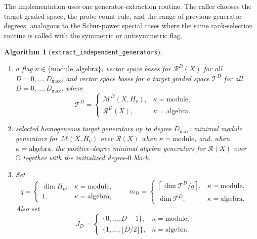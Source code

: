 \documentclass[11pt]{article}
\newcommand{\dsC}{\mathbb{C}}
\newcommand{\scM}{\mathcal{M}}
\newcommand{\scR}{\mathcal{R}}
\newcommand{\scT}{\mathcal{T}}
\newtheorem{algorithm}[theorem]{Algorithm}
\theoremstyle{definition}
\begin{document}
The implementation uses one generator-extraction routine. The caller chooses the target graded space, the probe-count rule, and the range of previous generator degrees, analogous to the Schur-power special cases where the same rank-selection routine is called with the symmetric or antisymmetric flag.

\begin{algorithm}[\texttt{extract\_independent\_generators}]\label{alg:extract-independent-generators}

  \phantom{}
  \begin{enumerate}[label=\textbf{Step \arabic*.},leftmargin=2.8cm]

    \item[\textbf{Input:}] a flag $\kappa\in\{\mathrm{module},\mathrm{algebra}\}$; vector space bases for $\scR^D(X)$ for all $D=0,\dots,D_{\max}$; and vector space bases for a target graded space $\scT^D$ for all $D=0,\dots,D_{\max}$, where
    \[
      \scT^D=
      \begin{cases}
        \scM^D(X,H_\nu), & \kappa=\mathrm{module},\\
        \scR^D(X), & \kappa=\mathrm{algebra}.
      \end{cases}
    \]

    \item[\textbf{Output:}] selected homogeneous target generators up to degree $D_{\max}$: minimal module generators for $\scM(X,H_\nu)$ over $\scR(X)$ when $\kappa=\mathrm{module}$, and, when $\kappa=\mathrm{algebra}$, the positive-degree minimal algebra generators for $\scR(X)$ over $\dsC$ together with the initialized degree-$0$ block.

    \item Set
    \[
      q=
      \begin{cases}
        \dim H_\nu, & \kappa=\mathrm{module},\\
        1, & \kappa=\mathrm{algebra},
      \end{cases}
      \qquad
      m_D=
      \begin{cases}
        \left\lceil \dim\scT^D/q\right\rceil, & \kappa=\mathrm{module},\\
        \dim\scT^D, & \kappa=\mathrm{algebra}.
      \end{cases}
    \]
    Also set
    \[
      J_D=
      \begin{cases}
        \{0,\dots,D-1\}, & \kappa=\mathrm{module},\\
        \{1,\dots,\lfloor D/2\rfloor\}, & \kappa=\mathrm{algebra}.
      \end{cases}
    \]


\end{enumerate}
\end{algorithm}
\end{document}
